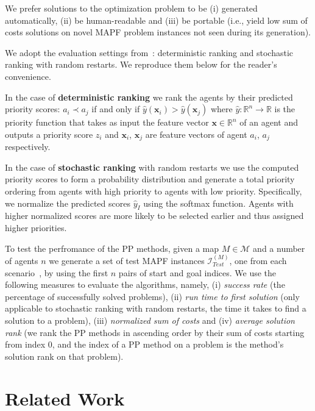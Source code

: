 We prefer solutions to the optimization problem to be (i) generated automatically,  (ii) be human-readable and (iii) be portable (i.e., yield low sum of costs solutions on novel MAPF problem instances not seen during its generation).

We adopt the evaluation settings from~\citet{zhang2learning}: deterministic ranking and stochastic ranking with random restarts. We reproduce them below for the reader's convenience.

In the case of \textbf{deterministic ranking} we rank the agents by their predicted priority scores: $ a_i \prec a_j $ if and only if $ \hat{y}(\mathbf{x}_i) > \hat{y}(\mathbf{x}_j) $ where $ \hat{y} : \mathbb{R}^n \rightarrow \mathbb{R} $ is the priority function that takes as input the feature vector $ \mathbf{x} \in \mathbb{R}^n $ of an agent and outputs a priority score $ z_i $ and $ \mathbf{x}_i $, $ \mathbf{x}_j $ are feature vectors of agent $ a_i $, $ a_j $ respectively.

In the case of \textbf{stochastic ranking} with random restarts we use the computed priority scores to form a probability distribution and generate a total priority ordering from agents with high priority to agents with low priority. Specifically, we normalize the predicted scores $ \hat{y}_I $ using the softmax function. Agents with higher normalized scores are more likely to be selected earlier and thus assigned higher priorities.

To test the perfromance of the PP methods, given a map $ M \in \mathcal{M} $ and a number of agents $ n $ we generate a set of test MAPF instances $ \mathcal{I}^{(M)}_{Test} $, one from each scenario~\citep{stern2019multi}, by using the first $ n $ pairs of start and goal indices. We use the following measures to evaluate the algorithms, namely, (i) \textit{success rate} (the percentage of successfully solved problems), (ii) \textit{run time to first solution} (only applicable to stochastic ranking with random restarts, the time it takes to find a solution to a problem), (iii) \textit{normalized sum of costs} and (iv) \textit{average solution rank} (we rank the PP methods in ascending order by their sum of costs starting from index $ 0 $, and the index of a PP method on a problem is the method's solution rank on that problem).

\section{Related Work}
\label{sec:relatedWork}

